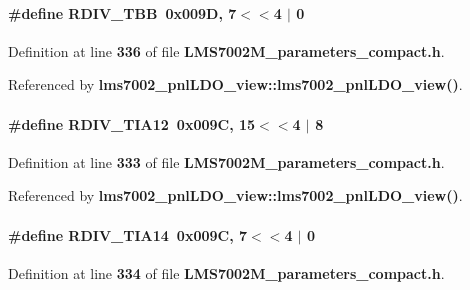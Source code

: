 \paragraph[{R\+D\+I\+V\+\_\+\+T\+BB}]{\setlength{\rightskip}{0pt plus 5cm}\#define R\+D\+I\+V\+\_\+\+T\+BB~0x009\+D, 7$<$$<$4 $\vert$  0}\label{LMS7002M__parameters__compact_8h_aed7a9cb5829d247ca71a62650f75220c}


Definition at line {\bf 336} of file {\bf L\+M\+S7002\+M\+\_\+parameters\+\_\+compact.\+h}.



Referenced by {\bf lms7002\+\_\+pnl\+L\+D\+O\+\_\+view\+::lms7002\+\_\+pnl\+L\+D\+O\+\_\+view()}.

\paragraph[{R\+D\+I\+V\+\_\+\+T\+I\+A12}]{\setlength{\rightskip}{0pt plus 5cm}\#define R\+D\+I\+V\+\_\+\+T\+I\+A12~0x009\+C, 15$<$$<$4 $\vert$  8}\label{LMS7002M__parameters__compact_8h_a2e316dd8f421b413e91ce0bcb955873b}


Definition at line {\bf 333} of file {\bf L\+M\+S7002\+M\+\_\+parameters\+\_\+compact.\+h}.



Referenced by {\bf lms7002\+\_\+pnl\+L\+D\+O\+\_\+view\+::lms7002\+\_\+pnl\+L\+D\+O\+\_\+view()}.

\paragraph[{R\+D\+I\+V\+\_\+\+T\+I\+A14}]{\setlength{\rightskip}{0pt plus 5cm}\#define R\+D\+I\+V\+\_\+\+T\+I\+A14~0x009\+C, 7$<$$<$4 $\vert$  0}\label{LMS7002M__parameters__compact_8h_ae702ca848cdb07f1e7b3abce31da82f6}


Definition at line {\bf 334} of file {\bf L\+M\+S7002\+M\+\_\+parameters\+\_\+compact.\+h}.



